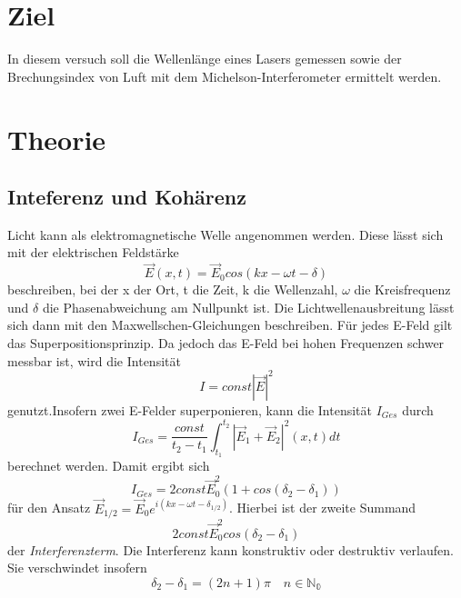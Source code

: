 \label{sec:Theorie}

\section{Ziel}

In diesem versuch soll die Wellenlänge eines Lasers gemessen sowie der Brechungsindex von Luft mit dem Michelson-Interferometer ermittelt werden.

\section{Theorie}

\subsection{Inteferenz und Kohärenz}
Licht kann als elektromagnetische Welle angenommen werden. Diese lässt sich mit der elektrischen Feldstärke 
\begin{equation}
  \vec E(x,t)=\vec E_{0}cos(kx-\omega t-\delta) 
  \label{koh}
\end{equation}
beschreiben, bei der x der Ort, t die Zeit, k die Wellenzahl, $\omega$ die Kreisfrequenz und $\delta$ die Phasenabweichung am Nullpunkt ist. Die Lichtwellenausbreitung lässt sich dann mit den Maxwellschen-Gleichungen beschreiben. Für jedes E-Feld gilt das Superpositionsprinzip. Da jedoch das E-Feld bei hohen Frequenzen schwer messbar ist, wird die Intensität 
\begin{equation}
  I=const|\vec E|^2 \nonumber
\end{equation}
genutzt.Insofern zwei E-Felder superponieren, kann die Intensität $I_{Ges}$ durch
\begin{equation}
  I_{Ges}=\frac{const}{t_{2}-t_{1}} \int^{t_{2}}_{t_{1}} |\vec E_{1}+\vec E_{2}|^2 (x,t)dt \nonumber
\end{equation}
berechnet werden. Damit ergibt sich 
\begin{equation}
  I_{Ges}=2const\vec E_{0}^2 (1+cos(\delta_{2}-\delta_{1})) \nonumber
\end{equation}
für den Ansatz $\vec E_{1/2}=\vec E_{0}e^{i(kx-\omega t -\delta_{1/2})}$. Hierbei ist der zweite Summand
\begin{equation}
  2const\vec E_{0}^2 cos(\delta_{2}-\delta_{1}) \nonumber
\end{equation}
der \textit{Interferenzterm}.
Die Interferenz kann konstruktiv oder destruktiv verlaufen. Sie verschwindet insofern 
\begin{equation}
  \delta_{2}-\delta_{1}=(2n+1)\pi \quad n \in \mathds{N_{0}} \nonumber
\end{equation}
